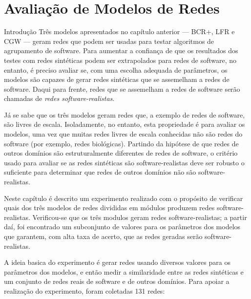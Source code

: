 %	
%

\chapter{Avaliação de Modelos de Redes} \label{cap:avaliacao}

\begin{section}{Introdução}
Três modelos apresentados no capítulo anterior --- BCR+, LFR e CGW --- geram redes que podem ser usadas para testar algoritmos de agrupamento de software. Para aumentar a confiança de que os resultados dos testes com redes sintéticas podem ser extrapolados para redes de software, no entanto, é preciso avaliar se, com uma escolha adequada de parâmetros, os modelos são capazes de gerar redes sintéticas que se assemelham a redes de software. Daqui para frente, redes que se assemelham a redes de software serão chamadas de \emph{redes software-realistas}.

Já se sabe que os três modelos geram redes que, a exemplo de redes de software, são livres de escala. Isoladamente, no entanto, esta propriedade é para avaliar os modelos, uma vez que muitas redes livres de escala conhecidas não são redes do software (por exemplo, redes biológicas). Partindo da hipótese de que redes de outros domínios são estruturalmente diferentes de redes de software, o critério usado para avaliar se as redes sintéticas são software-realistas deve ser robusto o suficiente para determinar que redes de outros domínios não são software-realistas.

Neste capítulo é descrito um experimento realizado com o propósito de verificar quais dos três modelos de redes divididas em módulos produzem redes software-realistas. Verificou-se que os três modulos geram redes software-realistas; a partir daí, foi encontrado um subconjunto de valores para os parâmetros dos modelos que garantem, com alta taxa de acerto, que as redes geradas serão software-realistas.

A ideia basica do experimento é gerar redes usando diversos valores para os parâmetros dos modelos, e então medir a similaridade entre as redes sintéticas e um conjunto de redes reais de software e de outros domínios. Para apoiar a realização do experimento, foram coletadas 131 redes:


\end{section}
